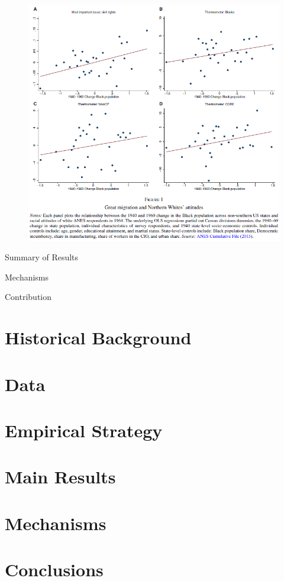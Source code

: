 \documentclass[dvipdfmx,11pt]{beamer}
\begin{document}
\begin{frame}{}
  \begin{figure}
    \centering
    \includegraphics[scale = .45]{fig_tab/os20220708/F1.png}
  \end{figure}
\end{frame}

\begin{frame}{Summary of Results}
  
\end{frame}

\begin{frame}{Mechanisms}
  
\end{frame}

\begin{frame}{Contribution}
  
\end{frame}

\section{Historical Background}
\frame{\sectionpage}

\section{Data}
\frame{\sectionpage}

\section{Empirical Strategy}
\frame{\sectionpage}

\section{Main Results}
\frame{\sectionpage}

\section{Mechanisms}
\frame{\sectionpage}

\section{Conclusions}
\frame{\sectionpage}
\end{document}
